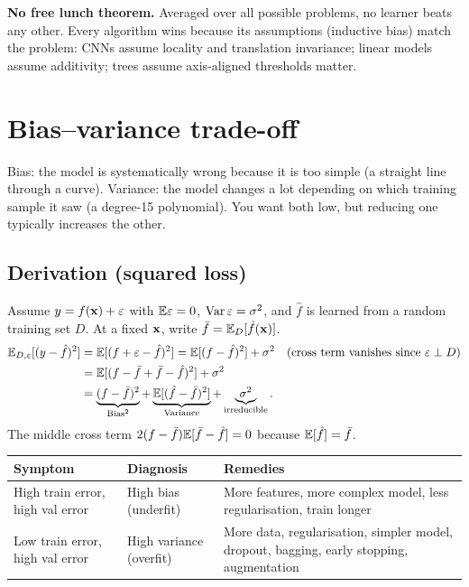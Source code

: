 \textbf{No free lunch theorem.} Averaged over all possible problems, no learner beats any other. Every algorithm wins because its assumptions (inductive bias) match the problem: CNNs assume locality and translation invariance; linear models assume additivity; trees assume axis-aligned thresholds matter.

\section{Bias--variance trade-off}

\begin{intuition}
Bias: the model is systematically wrong because it is too simple (a straight line through a curve). Variance: the model changes a lot depending on which training sample it saw (a degree-15 polynomial). You want both low, but reducing one typically increases the other.
\end{intuition}

\subsection{Derivation (squared loss)}
Assume $y=f(\mathbf{x})+\varepsilon$ with $\mathbb{E}\varepsilon=0$, $\operatorname{Var}\varepsilon=\sigma^2$, and $\hat f$ is learned from a random training set $D$. At a fixed $\mathbf{x}$, write $\bar f=\mathbb{E}_D[\hat f(\mathbf{x})]$.
\begin{align*}
\mathbb{E}_{D,\varepsilon}[(y-\hat f)^2]
&=\mathbb{E}[(f+\varepsilon-\hat f)^2]
=\mathbb{E}[(f-\hat f)^2]+\sigma^2 \quad(\text{cross term vanishes since }\varepsilon\perp D)\\
&=\mathbb{E}[(f-\bar f+\bar f-\hat f)^2]+\sigma^2\\
&=\underbrace{(f-\bar f)^2}_{\text{Bias}^2}+\underbrace{\mathbb{E}[(\hat f-\bar f)^2]}_{\text{Variance}}+\underbrace{\sigma^2}_{\text{irreducible}}.
\end{align*}
The middle cross term $2(f-\bar f)\mathbb{E}[\bar f-\hat f]=0$ because $\mathbb{E}[\hat f]=\bar f$.

\begin{tabular}{@{}p{}p{}p{}@{}}
\toprule
Symptom & Diagnosis & Remedies\\
\midrule
High train error, high val error & High bias (underfit) & More features, more complex model, less regularisation, train longer\\
Low train error, high val error & High variance (overfit) & More data, regularisation, simpler model, dropout, bagging, early stopping, augmentation\\
\bottomrule
\end{tabular}

